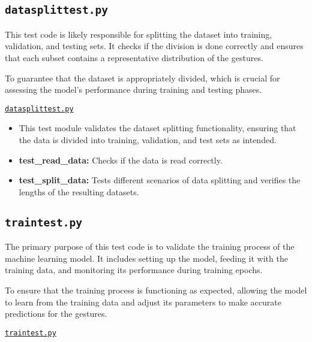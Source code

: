 			\subsection{\texttt{datasplittest.py}}
			
			This test code is likely responsible for splitting the dataset into training, validation, and testing sets. It checks if the division is done correctly and ensures that each subset contains a representative distribution of the gestures.
			
			To guarantee that the dataset is appropriately divided, which is crucial for assessing the model's performance during training and testing phases.
			
			\href{../Documents/MagicWand/ML23-06-Magic-Wand-with-an-Arduino-Nano-33-BLE-sense/Sourcecode/Code/Datatraining/Tests/datasplittest.py}{\texttt{datasplittest.py}}
			
			\begin{itemize}
				
				\item This test module validates the dataset splitting functionality, ensuring that the data is divided into training, validation, and test sets as intended.
				
				\item \textbf{test\_read\_data:} Checks if the data is read correctly.
				
				\item \textbf{test\_split\_data:} Tests different scenarios of data splitting and verifies the lengths of the resulting datasets.
				
			\end{itemize}
			
			\subsection{\texttt{traintest.py}}
			
			The primary purpose of this test code is to validate the training process of the machine learning model. It includes setting up the model, feeding it with the training data, and monitoring its performance during training epochs.
			
			To ensure that the training process is functioning as expected, allowing the model to learn from the training data and adjust its parameters to make accurate predictions for the gestures.
			
			\href{../Documents/MagicWand/ML23-06-Magic-Wand-with-an-Arduino-Nano-33-BLE-sense/Sourcecode/Code/Datatraining/Tests/traintest.py}{\texttt{traintest.py}}
			

